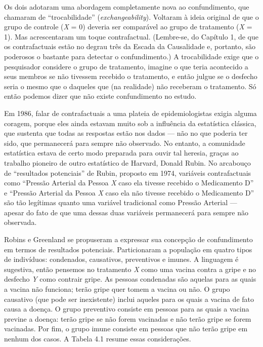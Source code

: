 \documentclass[11pt,a5paper,twoside]{book}
\begin{document}
Os dois adotaram uma abordagem completamente nova ao confundimento, que chamaram de “trocabilidade” (\textit{exchangeability}). Voltaram à ideia original de que o grupo de controle (\textit{X} = 0) deveria ser comparável ao grupo de tratamento (\textit{X} = 1). Mas acrescentaram um toque contrafactual. (Lembre-se, do Capítulo 1, de que os contrafactuais estão no degrau três da Escada da Causalidade e, portanto, são poderosos o bastante para detectar o confundimento.) A trocabilidade exige que o pesquisador considere o grupo de tratamento, imagine o que teria acontecido a seus membros se não tivessem recebido o tratamento, e então julgue se o desfecho seria o mesmo que o daqueles que (na realidade) não receberam o tratamento. Só então podemos dizer que não existe confundimento no estudo.

Em 1986, falar de contrafactuais a uma plateia de epidemiologistas exigia alguma coragem, porque eles ainda estavam muito sob a influência da estatística clássica, que sustenta que todas as respostas estão nos dados — não no que poderia ter sido, que permanecerá para sempre não observado. No entanto, a comunidade estatística estava de certo modo preparada para ouvir tal heresia, graças ao trabalho pioneiro de outro estatístico de Harvard, Donald Rubin. No arcabouço de “resultados potenciais” de Rubin, proposto em 1974, variáveis contrafactuais como “Pressão Arterial da Pessoa \textit{X} caso ela tivesse recebido o Medicamento D” e “Pressão Arterial da Pessoa \textit{X} caso ela não tivesse recebido o Medicamento D” são tão legítimas quanto uma variável tradicional como Pressão Arterial — apesar do fato de que uma dessas duas variáveis permanecerá para sempre não observada.

Robins e Greenland se propuseram a expressar sua concepção de confundimento em termos de resultados potenciais. Particionaram a população em quatro tipos de indivíduos: condenados, causativos, preventivos e imunes. A linguagem é sugestiva, então pensemos no tratamento \textit{X} como uma vacina contra a gripe e no desfecho \textit{Y} como contrair gripe. As pessoas condenadas são aquelas para as quais a vacina não funciona; terão gripe quer tomem a vacina ou não. O grupo causativo (que pode ser inexistente) inclui aqueles para os quais a vacina de fato causa a doença. O grupo preventivo consiste em pessoas para as quais a vacina previne a doença: terão gripe se não forem vacinadas e não terão gripe se forem vacinadas. Por fim, o grupo imune consiste em pessoas que não terão gripe em nenhum dos casos. A Tabela 4.1 resume essas considerações.
\end{document}
